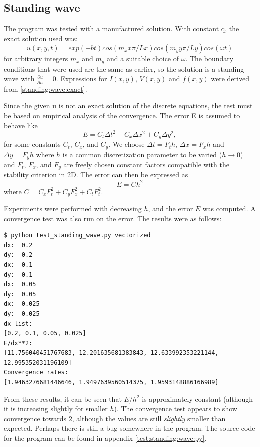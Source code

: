 \documentclass[twoside]{article}
\begin{document}
\subsection{Standing wave}

The program was tested with a manufactured solution. With constant q, the exact solution used was:
\begin{equation}
u(x,y,t)=exp(-bt)cos(m_xx\pi/Lx)cos(m_yy\pi/Ly)cos(\omega t)
\label{standing:wave:exact}
\end{equation}
for arbitrary integers $m_x$ and $m_y$ and a suitable choice of $\omega$. The boundary conditions that were used are the same as earlier, so the solution is a standing wave with $\frac{\partial u}{\partial n} = 0$.
Expressions for $I(x,y)$, $V(x,y)$ and $f(x,y)$ were derived from \eqref{standing:wave:exact}.

Since the given u is not an exact solution of the discrete equations, the test must be based on empirical analysis of the convergence. The error E is assumed to behave like
\begin{equation}
E=C_t\Delta t^2+C_x\Delta x^2+C_y\Delta y^2,
\end{equation}
for some constants $C_t$, $C_x$, and $C_y$. We choose $\Delta t=F_th$, $\Delta x=F_xh$ and $\Delta y=F_yh$ where $h$ is a common discretization parameter to be varied ($h\rightarrow 0$) and $F_t$, $F_x$, and $F_y$ are freely chosen constant factors compatible with the stability criterion in 2D. The error can then be expressed as
\begin{equation}
E=Ch^2
\end{equation}
where $C=C_xF^2_t+C_yF^2_x+C_tF^2_t.$

Experiments were performed with decreasing $h$, and the error $E$ was computed. A convergence test was also run on the error. The results were as follows:

\begin{verbatim}
$ python test_standing_wave.py vectorized
dx:  0.2
dy:  0.2
dx:  0.1
dy:  0.1
dx:  0.05
dy:  0.05
dx:  0.025
dy:  0.025
dx-list:
[0.2, 0.1, 0.05, 0.025]
E/dx**2: 
[11.756040451767683, 12.201635681383843, 12.633992353221144, 12.995352031196109]
Convergence rates: 
[1.9463276681446646, 1.9497639560514375, 1.9593148886166989]
\end{verbatim}

From these results, it can be seen that $E/h^2$ is approximately constant (although it is increasing slightly for smaller $h$). The convergence test appears to show convergence towards $2$, although the values are still \emph{slightly} smaller than expected. Perhaps there is still a bug somewhere in the program. The source code for the program can be found in appendix \ref{test:standing:wave:py}.
\end{document}
